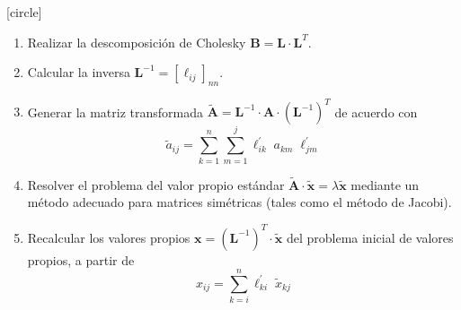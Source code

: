 \begin{frame}
\fontsize{12}{12}\selectfont
{}
[circle]
\begin{enumerate}[<+->]
\item Realizar la descomposición de Cholesky $\mathbf{B} = \mathbf{L} \cdot \mathbf{L}^{T}$.
\item Calcular la inversa $\mathbf{L}^{-1} = [\ell_{ij}]_{nn}$.
\item Generar la matriz transformada $\mathbf{\widetilde{A}} = \mathbf{L}^{-1} \cdot \mathbf{A} \cdot \left( \mathbf{L}^{-1} \right)^{T}$ de acuerdo con
\[ \widetilde{a}_{ij} = \sum_{k = 1}^{n} \sum_{m = 1}^{j} \ell_{ik}^{\prime} \; a_{km} \; \ell_{jm}^{\prime} \]
\item Resolver el problema del valor propio estándar $\mathbf{\widetilde{A}} \cdot \mathbf{\widetilde{x}} = \lambda \mathbf{\widetilde{x}}$ mediante un método adecuado para matrices simétricas (tales como el método de Jacobi).
\item Recalcular los valores propios $\mathbf{x} = (\mathbf{L}^{-1})^{T} \cdot \mathbf{\widetilde{x}}$ del problema inicial de valores propios, a partir de 
\begin{equation}
x_{ij} = \sum_{k = i}^{n} \ell_{ki}^{\prime} \; \widetilde{x}_{kj}
\label{eq:ecuacion_08_37}
\end{equation}
\end{enumerate}
\end{frame}
